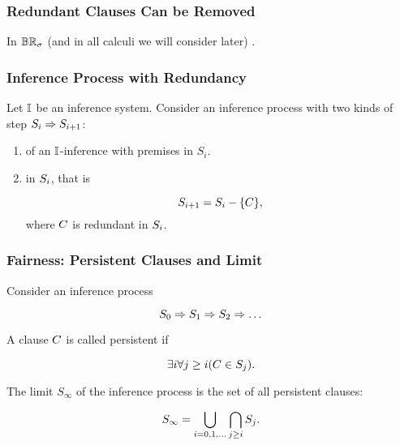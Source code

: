                 
\begin{frame}
  \frametitle{Redundant Clauses Can be Removed}


  In $\mathbb{BR}_{\sigma}$ (and in all calculi we will consider later) 
  .

\end{frame}


                \begin{frame}\frametitle{Inference Process with Redundancy}

Let ${\mathbb{I}}$ be an inference system. Consider an inference process with
two kinds of step ${S_i \Rightarrow S_{i+1}}$:

\begin{enumerate}
\item {} of an ${\mathbb{I}}$-inference with
  premises in $S_i$.
  \bigskip
  
\item {} in ${S_i}$, that is 

  \[{S_{i+1} = S_i - {\{C\}}},\]
where ${C}$ is redundant in ${S_i}$.
\end{enumerate}

                                \end{frame}



                 \begin{frame}\frametitle{Fairness: Persistent Clauses and Limit}

Consider an inference process

\[{
  S_0 \Rightarrow S_1 \Rightarrow S_2 \Rightarrow \ldots
}\]

\bigskip

A clause ${C}$ is called \alert{persistent} if

\[{
    \exists i \forall j \geq i (C \in S_j).
  }\]

\bigskip


The \alert{limit $S_\infty$} of the inference process is
the set of all persistent clauses:

\[{
  S_\infty = \bigcup_{i=0,1,\ldots}\bigcap_{j \geq i} S_j.
}\]

                                \end{frame}

